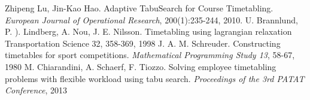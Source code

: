 \documentclass[11pt]{report}
\begin{document}
\begin{thebibliography}{2}
 Zhipeng Lu, Jin-Kao Hao. Adaptive TabuSearch for Course Timetabling.  \emph{European Journal of Operational Research}, 200(1):235-244, 2010.
 U. Brannlund, P. ). Lindberg, A. Nou, J. E. Nilsson. Timetabling using lagrangian relaxation Transportation Science 32, 358-369, 1998
 J. A. M. Schreuder. Constructing timetables for sport competitions. \emph{Mathematical Programming Study 13}, 58-67, 1980
 M. Chiarandini, A. Schaerf, F. Tiozzo. Solving employee timetabling problems with flexible workload using tabu search. \emph{Proceedings of the 3rd PATAT Conference}, 2013
\end{thebibliography}
\end{document}
